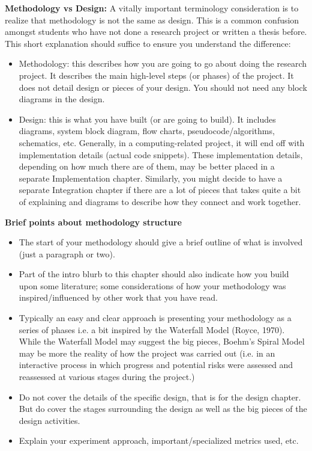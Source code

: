 \textbf{Methodology vs Design:} A vitally important terminology consideration is to realize that  methodology is not the same as design. This is a common confusion amongst students who have not done a research project or written a thesis before. This short explanation should suffice to ensure you understand the difference:

\begin{itemize}
	\item Methodology: this describes how you are going to go about doing the research project. It describes the main high-level steps (or phases) of the project. It does not detail design or pieces of your design. You should not need any block diagrams in the design.
	\item Design: this is what you have built (or are going to build). It includes diagrams, system block diagram, flow charts, pseudocode/algorithms, schematics, etc. Generally, in a computing-related project, it will end off with implementation details (actual code snippets). These implementation details, depending on how much there are of them, may be better placed in a separate Implementation chapter. Similarly, you might decide to have a separate Integration chapter if there are a lot of pieces that takes quite a bit of explaining and diagrams to describe how they connect and work together. 
\end{itemize}

\textbf{\color{red}Brief points about methodology structure}
\begin{itemize}
	\item The start of your methodology should give a brief outline of what is involved (just a paragraph or two). 
	\item Part of the intro blurb to this chapter should also indicate how you build upon some literature; some considerations of how your methodology was inspired/influenced by other work that you have read.
	\item Typically an easy and clear approach is presenting your methodology as a series of phases i.e. a bit inspired by the Waterfall Model (Royce, 1970). While the Waterfall Model may suggest the big pieces, Boehm's Spiral Model may be more the reality of how the project was carried out (i.e. in an interactive process in which progress and potential risks were assessed and reassessed at various stages during the project.)
	\item Do not cover the details of the specific design, that is for the design chapter. But do cover the stages surrounding the design as well as the big pieces of the design activities.
	\item Explain your experiment approach, important/specialized metrics used, etc.
\end{itemize}


